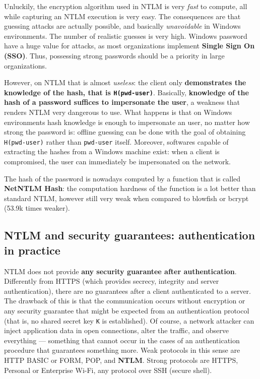 \documentclass[10pt]{extreport}
\begin{document}
Unluckily, the encryption algorithm used in NTLM is very \emph{fast} to
compute, all while capturing an NTLM execution is very easy. The consequences
are that guessing attacks are actually possible, and basically
\emph{unavoidable} in Windows environments. The number of realistic guesses is
very high. Windows password have a huge value for attacks, as most
organizations implement \textbf{Single Sign On (SSO)}. Thus, possessing strong
passwords should be a priority in large organizations.

However, on NTLM that is almost \emph{useless}: the client only
\textbf{demonstrates the knowledge of the hash, that is \texttt{H(pwd-user)}}.
Basically, \textbf{knowledge of the hash of a password suffices to impersonate
the user}, a weakness that renders NTLM very dangerous to use. What happens is
that on Windows environments hash knowledge is enough to impersonate an user,
no matter how strong the password is: offline guessing can be done with the
goal of obtaining \texttt{H(pwd-us\-er)} rather than \texttt{pwd-user} itself.
Moreover, softwares capable of extracting the hashes from a Windows machine
exist: when a client is compromised, the user can immediately be impersonated
on the network.

The hash of the password is nowadays computed by a function that is called
\textbf{NetNTLM Hash}: the computation hardness of the function is a lot better
than standard NTLM, however still very weak when compared to blowfish or bcrypt
(53.9k times weaker).

\subsection{NTLM and security guarantees: authentication in practice}

NTLM does not provide \textbf{any security guarantee after authentication}.
Differently from HTTPS (which provides secrecy, integrity and server
authentication), there are no guarantees after a client authenticated to a
server. The drawback of this is that the communication occurs without
encryption or any security guarantee that might be expected from an
authentication protocol (that is, no shared secret key \texttt{K} is
established). Of course, a network attacker can inject application data in open
connections, alter the traffic, and observe everything --- something that cannot
occur in the cases of an authentication procedure that guarantees something
more. Weak protocols in this sense are HTTP BASIC or FORM, POP, and
\textbf{NTLM}. Strong protocols are HTTPS, Personal or Enterprise Wi\--Fi, any
protocol over SSH (secure shell).
\end{document}
